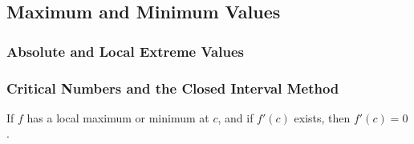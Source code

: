 \subsection{Maximum and Minimum Values}

\subsubsection*{Absolute and Local Extreme Values}

\subsubsection*{Critical Numbers and the Closed Interval Method}

\begin{theorem}
    If \(f\) has a local maximum or minimum at \(c\), and if \(f'(c)\) exists,
    then \(f'(c)=0\).
\end{theorem}